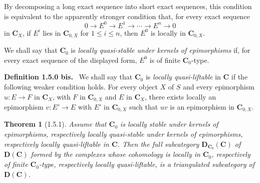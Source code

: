 \documentclass[14pt]{extarticle}
\newenvironment{statement}[1]{\par\medskip\noindent\textbf{#1.}\ }{\par\medskip}
\newtheorem*{theorem*}{Theorem}
\begin{document}
By decomposing a long exact sequence into short exact sequences, this condition is equivalent to the apparently stronger condition that, for every exact sequence
\[
0\longrightarrow E^0\longrightarrow E^1\longrightarrow\cdots\longrightarrow E^n\longrightarrow0
\]
in $\mathbf C_X$, if $E^i$ lies in $\mathbf C_{0,X}$ for $1\le i\le n$, then $E^0$ is locally in $\mathbf C_{0,X}$.

We shall say that $\mathbf C_0$ is \emph{locally quasi-stable under kernels of epimorphisms} if, for every exact sequence of the displayed form, $E^0$ is of finite $\mathbf C_0$-type.

\begin{statement}{Definition 1.5.0 bis}
We shall say that $\mathbf C_0$ is \emph{locally quasi-liftable} in $\mathbf C$ if the following weaker condition holds. For every object $X$ of $S$ and every epimorphism $u:E\to F$ in $\mathbf C_X$, with $F$ in $\mathbf C_{0,X}$ and $E$ in $\mathbf C_X$, there exists locally an epimorphism $v:E'\to E$ with $E'$ in $\mathbf C_{0,X}$ such that $uv$ is an epimorphism in $\mathbf C_{0,X}$.
\end{statement}

\begin{theorem*}[1.5.1]
Assume that $\mathbf C_0$ is locally stable under kernels of epimorphisms, respectively locally quasi-stable under kernels of epimorphisms, respectively locally quasi-liftable in $\mathbf C$. Then the full subcategory $\mathbf D_{\mathbf C_0}(\mathbf C)$ of $\mathbf D(\mathbf C)$ formed by the complexes whose cohomology is locally in $\mathbf C_0$, respectively of finite $\mathbf C_0$-type, respectively locally quasi-liftable, is a triangulated subcategory of $\mathbf D(\mathbf C)$.
\end{theorem*}

\bigskip
\end{document}
